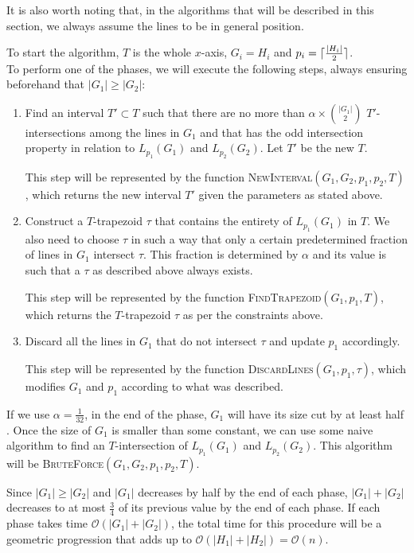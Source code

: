 \documentclass{article}
\DeclarePairedDelimiter\ceil{\lceil}{\rceil}
\def\bigo{\mathcal{O}}
\begin{document}
It is also worth noting that, in the algorithms that will be described in this section, we always assume the lines to be in general position.

To start the algorithm, $T$ is the whole $x$-axis,
$G_i = H_i$ and $p_i = \ceil{\frac{|H_i|}{2}}$.\\

To perform one of the phases, we will execute the following steps, always ensuring beforehand that $|G_1|\geq|G_2|$:

\begin{enumerate}
\item Find an interval $T'\subset T$ such that there are no more than  $\alpha \times {|G_1| \choose 2}$ $T'$-intersections among the lines in $G_1$ and that has the odd intersection property in relation to $L_{p_1}(G_1)$ and $L_{p_2}(G_2)$. Let $T'$ be the new $T$.

This step will be represented by the function \textsc{NewInterval}$(G_1,G_2,p_1,p_2,T)$, which returns the new interval $T'$ given the parameters as stated above.

\item Construct a $T$-trapezoid $\tau$ that contains the entirety of $L_{p_1}(G_1)$ in $T$. We also need to choose $\tau$ in such a way that only a certain predetermined fraction of lines in $G_1$ intersect $\tau$. This fraction is determined by $\alpha$ and its value is such that a $\tau$ as described above always exists. 

This step will be represented by the function \textsc{FindTrapezoid}$(G_1,p_1,T)$, which returns the $T$-trapezoid $\tau$ as per the constraints above.

\item Discard all the lines in $G_1$ that do not intersect $\tau$ and update $p_1$ accordingly.

This step will be represented by the function \textsc{DiscardLines}$(G_1,p_1,\tau)$, which modifies $G_1$ and $p_1$ according to what was described.


\end{enumerate}

If we use $\alpha=\frac{1}{32}$, in the end of the phase, $G_1$ will have its size cut by at least half \cite[Lemma 3.5]{LoMS1994}. Once the size of $G_1$ is smaller than some constant, we can use some naive algorithm to find an $T$-intersection of $L_{p_1}(G_1)$ and $L_{p_2}(G_2)$. This algorithm will be \textsc{BruteForce}$(G_1,G_2,p_1,p_2,T)$.

Since $|G_1|\geq|G_2|$ and $|G_1|$ decreases by half by the end of each phase, $|G_1|+|G_2|$ decreases to at most $\frac{3}{4}$ of its previous value by the end of each phase. If each phase takes time $\bigo(|G_1|+|G_2|)$, the total time for this procedure will be a geometric progression that adds up to $\bigo(|H_1|+|H_2|)=\bigo(n)$.
\end{document}
